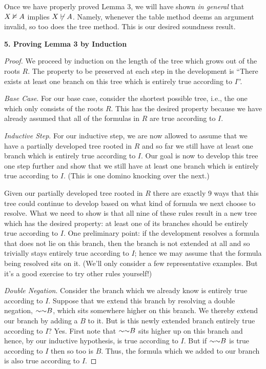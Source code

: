 \documentclass[options]{philosophersimprint}
\begin{document}
Once we have properly proved Lemma 3, we will have shown \textit{in general} that $X \nvDash A$ implies $X \not\vdash A$. Namely, whenever the table method deems an argument invalid, so too does the tree method. This is our desired soundness result.

\textbf{5. Proving Lemma 3 by Induction}

\begin{proof}
We proceed by induction on the length of the tree which grows out of the roots $R$. The property to be preserved at each step in the development is ``There exists at least one branch on this tree which is entirely true according to $I$''.

\textit{Base Case}. For our base case, consider the shortest possible tree, i.e., the one which only consists of the roots $R$. This has the desired property because we have already assumed that all of the formulas in $R$ are true according to $I$.

\textit{Inductive Step}. For our inductive step, we are now allowed to assume that we have a partially developed tree rooted in $R$ and so far we still have at least one branch which is entirely true according to $I$. Our goal is now to develop this tree one step further and show that we still have at least one branch which is entirely true according to $I$. (This is one domino knocking over the next.)

Given our partially developed tree rooted in $R$ there are exactly 9 ways that this tree could continue to develop based on what kind of formula we next choose to resolve. What we need to show is that all nine of these rules result in a new tree which has the desired property: at least one of its branches should be entirely true according to $I$. One preliminary point: if the development resolves a formula that does not lie on this branch, then the branch is not extended at all and so trivially stays entirely true according to $I$; hence we may assume that the formula being resolved sits on it. (We'll only consider a few representative examples. But it's a good exercise to try other rules yourself!)

\textit{Double Negation}. Consider the branch which we already know is entirely true according to $I$. Suppose that we extend this branch by resolving a double negation, $\mathord{\sim} \mathord{\sim} B$, which sits somewhere higher on this branch. We thereby extend our branch by adding a $B$ to it. But is this newly extended branch entirely true according to $I$? Yes. First note that $\mathord{\sim} \mathord{\sim} B$ sits higher up on this branch and hence, by our inductive hypothesis, is true according to $I$. But if $\mathord{\sim} \mathord{\sim} B$ is true according to $I$ then so too is $B$. Thus, the formula which we added to our branch is also true according to $I$.


\end{proof}
\end{document}
